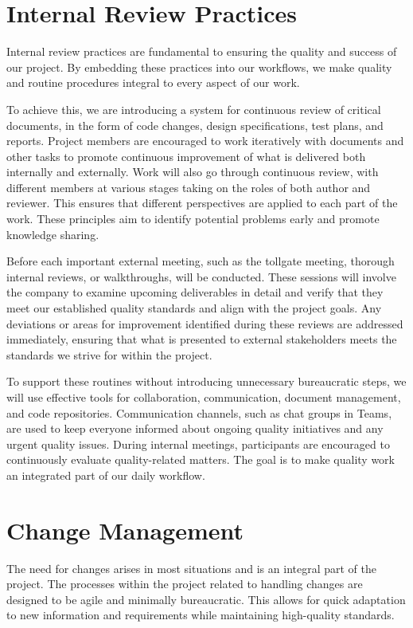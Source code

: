 \documentclass{article}
\begin{document}
\newpage
\section{Internal Review Practices}
Internal review practices are fundamental to ensuring the quality and success of our project. By embedding these practices into our workflows, we make quality and routine procedures integral to every aspect of our work.

To achieve this, we are introducing a system for continuous review of critical documents, in the form of code changes, design specifications, test plans, and reports. Project members are encouraged to work iteratively with documents and other tasks to promote continuous improvement of what is delivered both internally and externally. Work will also go through continuous review, with different members at various stages taking on the roles of both author and reviewer. This ensures that different perspectives are applied to each part of the work. These principles aim to identify potential problems early and promote knowledge sharing.

Before each important external meeting, such as the tollgate meeting, thorough internal reviews, or walkthroughs, will be conducted. These sessions will involve the company to examine upcoming deliverables in detail and verify that they meet our established quality standards and align with the project goals. Any deviations or areas for improvement identified during these reviews are addressed immediately, ensuring that what is presented to external stakeholders meets the standards we strive for within the project.

To support these routines without introducing unnecessary bureaucratic steps, we will use effective tools for collaboration, communication, document management, and code repositories. Communication channels, such as chat groups in Teams, are used to keep everyone informed about ongoing quality initiatives and any urgent quality issues. During internal meetings, participants are encouraged to continuously evaluate quality-related matters. The goal is to make quality work an integrated part of our daily workflow.

\newpage
\section{Change Management}

The need for changes arises in most situations and is an integral part of the project. The processes within the project related to handling changes are designed to be agile and minimally bureaucratic. This allows for quick adaptation to new information and requirements while maintaining high-quality standards.
\end{document}
